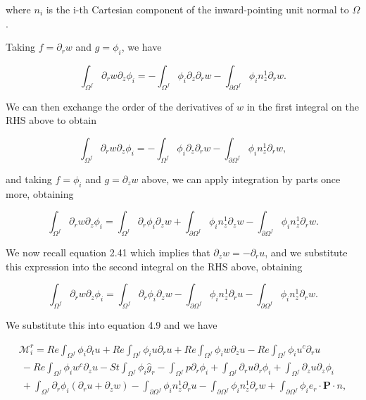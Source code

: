 \documentclass{article}
\begin{document}
where \(n_i\) is the i-th Cartesian component of the inward-pointing unit normal to \(\Omega\).

Taking \(f = \partial_r w\) and \(g = \phi_i\), we have

\begin{equation}
\int_{\Omega^f}\partial_r w\partial_z\phi_i = -\int_{\Omega^f}\phi_i\partial_z\partial_r w - \int_{\partial\Omega^f}\phi_i n_z^1\partial_r w. \tag{4.12}
\end{equation}

We can then exchange the order of the derivatives of \(w\) in the first integral on the RHS above to obtain

\begin{equation}
\int_{\Omega^f}\partial_r w\partial_z\phi_i = -\int_{\Omega^f}\phi_i\partial_z\partial_r w - \int_{\partial\Omega^f}\phi_i n_z^1\partial_r w, \tag{4.13}
\end{equation}

and taking \(f = \phi_i\) and \(g = \partial_z w\) above, we can apply integration by parts once more, obtaining

\begin{equation}
\int_{\Omega^f}\partial_r w\partial_z\phi_i = \int_{\Omega^f}\partial_r\phi_i\partial_z w + \int_{\partial\Omega^f}\phi_i n_z^1\partial_z w - \int_{\partial\Omega^f}\phi_i n_z^1\partial_r w. \tag{4.14}
\end{equation}

We now recall equation 2.41 which implies that \(\partial_z w = -\partial_r u\), and we substitute this expression into the second integral on the RHS above, obtaining

\begin{equation}
\int_{\Omega^f}\partial_r w\partial_z\phi_i = \int_{\Omega^f}\partial_r\phi_i\partial_z w - \int_{\partial\Omega^f}\phi_i n_z^1\partial_r u - \int_{\partial\Omega^f}\phi_i n_z^1\partial_r w. \tag{4.15}
\end{equation}

We substitute this into equation 4.9 and we have

\begin{equation}
\begin{array}{l}{\mathcal{M}_i^r = Re\int_{\Omega^f}\phi_i\partial_tu + Re\int_{\Omega^f}\phi_iu\partial_r u + Re\int_{\Omega^f}\phi_iw\partial_z u - Re\int_{\Omega^f}\phi_iu^c\partial_r u}\\ {~ - Re\int_{\Omega^f}\phi_iw^c\partial_z u - St\int_{\Omega^f}\phi_i\hat{g}_r - \int_{\Omega^f}p\partial_r\phi_i + \int_{\Omega^f}\partial_r u\partial_r\phi_i + \int_{\Omega^f}\partial_z u\partial_z\phi_i}\\ {~ + \int_{\Omega^f}\partial_r\phi_i(\partial_r u + \partial_z w) - \int_{\partial\Omega^f}\phi_i n_z^1\partial_r u - \int_{\partial\Omega^f}\phi_i n_z^1\partial_r w + \int_{\partial\Omega^f}\phi_i e_r\cdot \pmb {P}\cdot n,} \end{array} \tag{4.16}
\end{equation}
\end{document}
